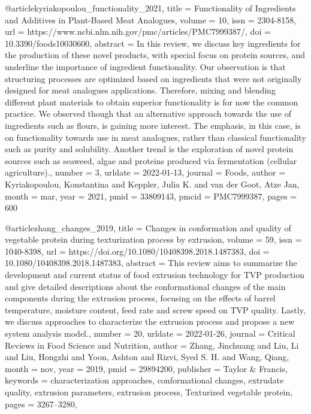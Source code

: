 @article{kyriakopoulou_functionality_2021,
	title = {Functionality of {Ingredients} and {Additives} in {Plant}-{Based} {Meat} {Analogues}},
	volume = {10},
	issn = {2304-8158},
	url = {https://www.ncbi.nlm.nih.gov/pmc/articles/PMC7999387/},
	doi = {10.3390/foods10030600},
	abstract = {In this review, we discuss key ingredients for the production of these novel products, with special focus on protein sources, and underline the importance of ingredient functionality. Our observation is that structuring processes are optimized based on ingredients that were not originally designed for meat analogues applications. Therefore, mixing and blending different plant materials to obtain superior functionality is for now the common practice. We observed though that an alternative approach towards the use of ingredients such as flours, is gaining more interest. The emphasis, in this case, is on functionality towards use in meat analogues, rather than classical functionality such as purity and solubility. Another trend is the exploration of novel protein sources such as seaweed, algae and proteins produced via fermentation (cellular agriculture).},
	number = {3},
	urldate = {2022-01-13},
	journal = {Foods},
	author = {Kyriakopoulou, Konstantina and Keppler, Julia K. and van der Goot, Atze Jan},
	month = mar,
	year = {2021},
	pmid = {33809143},
	pmcid = {PMC7999387},
	pages = {600}
}

@article{zhang_changes_2019,
	title = {Changes in conformation and quality of vegetable protein during texturization process by extrusion},
	volume = {59},
	issn = {1040-8398},
	url = {https://doi.org/10.1080/10408398.2018.1487383},
	doi = {10.1080/10408398.2018.1487383},
	abstract = {This review aims to summarize the development and current status of food extrusion technology for TVP production and give detailed descriptions about the conformational changes of the main components during the extrusion process, focusing on the effects of barrel temperature, moisture content, feed rate and screw speed on TVP quality. Lastly, we discuss approaches to characterize the extrusion process and propose a new system analysis model.},
	number = {20},
	urldate = {2022-01-26},
	journal = {Critical Reviews in Food Science and Nutrition},
	author = {Zhang, Jinchuang and Liu, Li and Liu, Hongzhi and Yoon, Ashton and Rizvi, Syed S. H. and Wang, Qiang},
	month = nov,
	year = {2019},
	pmid = {29894200},
	publisher = {Taylor \& Francis},
	keywords = {characterization approaches, conformational changes, extrudate quality, extrusion parameters, extrusion process, Texturized vegetable protein},
	pages = {3267--3280},
}

